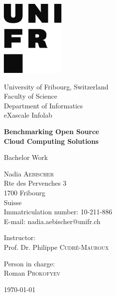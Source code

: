 \begin{titlepage} 
	\begin{center}
		
		\includegraphics[scale=0.4]{figures/UNF_Signet_100pr_pos.jpg}\\
		
		\vspace{0.5cm}
		
		University of Fribourg, Switzerland\\
		Faculty of Science\\
		Department of Informatics\\
		eXascale Infolab\\

		\vspace{1.5cm}

		\begin{huge}
			{\sf \textbf{Benchmarking Open Source}}\\
			\vspace{0.3cm}
			{\sf \textbf{Cloud Computing Solutions}}
		\end{huge}
		
				
		\vspace{1.5cm}

		Bachelor Work\\

		\vspace{1cm}
		
		Nadia \textsc{Aebischer}\\
		Rte des Pervenches 3\\
		1700 Fribourg\\
		Suisse\\
		Immatriculation number: 10-211-886\\
		E-mail: nadia.aebischer@unifr.ch\\

		\vspace{1cm}

		Instructor:\\
		Prof. Dr. Philippe \textsc{Cudré-Mauroux}\\

		\vspace{0.5cm}
		
		Person in charge:\\
		Roman \textsc{Prokofyev}\\

		\vspace{1cm}

		\today
				
	\end{center}
\end{titlepage}
